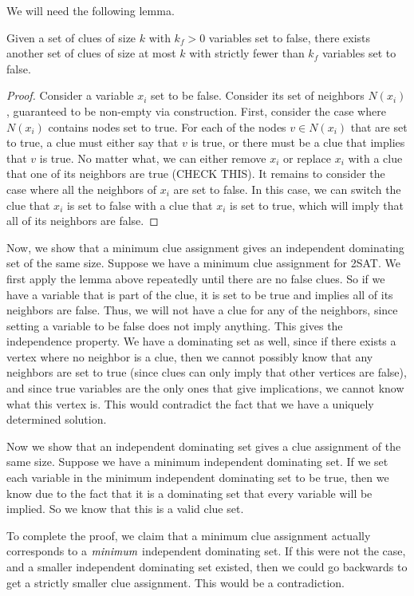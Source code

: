 \documentclass[runningheads,a4paper]{llncs}
\begin{document}
We will need the following lemma.

\begin{lemma} Given a set of clues of size $k$ with $k_f > 0$ variables set to false, there exists another set of clues of size at most $k$ with strictly fewer than $k_f$ variables set to false.
\end{lemma}

\begin{proof} 
Consider a variable $x_i$ set to be false. Consider its set of neighbors $N(x_i)$, guaranteed to be non-empty via construction. First, consider the case where $N(x_i)$ contains nodes set to true. For each of the nodes $v \in N(x_i)$ that are set to true, a clue must either say that $v$ is true, or there must be a clue that implies that $v$ is true. No matter what, we can either remove $x_i$ or replace $x_i$ with a clue that one of its neighbors are true (CHECK THIS). It remains to consider the case where all the neighbors of $x_i$ are set to false. In this case, we can switch the clue that $x_i$ is set to false with a clue that $x_i$ is set to true, which will imply that all of its neighbors are false.
\end{proof}

Now, we show that a minimum clue assignment gives an independent dominating set of the same size. Suppose we have a minimum clue assignment for 2SAT. We first apply the lemma above repeatedly until there are no false clues. So if we have a variable that is part of the clue, it is set to be true and implies all of its neighbors are false. Thus, we will not have a clue for any of the neighbors, since setting a variable to be false does not imply anything. This gives the independence property. We have a dominating set as well, since if there exists a vertex where no neighbor is a clue, then we cannot possibly know that any neighbors are set to true (since clues can only imply that other vertices are false), and since true variables are the only ones that give implications, we cannot know what this vertex is. This would contradict the fact that we have a uniquely determined solution.

Now we show that an independent dominating set gives a clue assignment of the same size. Suppose we have a minimum independent dominating set. If we set each variable in the minimum independent dominating set to be true, then we know due to the fact that it is a dominating set that every variable will be implied. So we know that this is a valid clue set.

To complete the proof, we claim that a minimum clue assignment actually corresponds to a $\emph{minimum}$ independent dominating set. If this were not the case, and a smaller independent dominating set existed, then we could go backwards to get a strictly smaller clue assignment. This would be a contradiction. 
\end{document}
